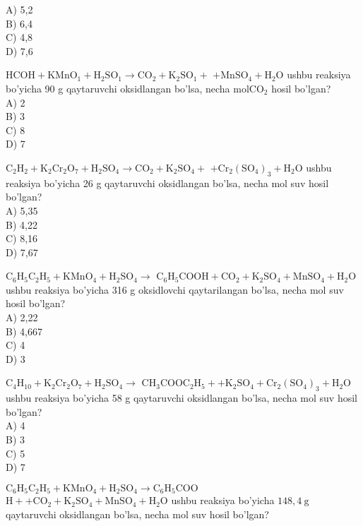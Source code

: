 A) 5,2\\
B) 6,4\\
C) 4,8\\
D) 7,6
  \item $\mathrm{HCOH}+\mathrm{KMnO}_{1}+\mathrm{H}_{2} \mathrm{SO}_{1} \rightarrow \mathrm{CO}_{2}+\mathrm{K}_{2} \mathrm{SO}_{1}+$ $+\mathrm{MnSO}_{4}+\mathrm{H}_{2} \mathrm{O}$ ushbu reaksiya bo'yicha 90 g qaytaruvchi oksidlangan bo'lsa, necha $\mathrm{mol} \mathrm{CO}_{2}$ hosil bo'lgan?\\
A) 2\\
B) 3\\
C) 8\\
D) 7
  \item $\mathrm{C}_{2} \mathrm{H}_{2}+\mathrm{K}_{2} \mathrm{Cr}_{2} \mathrm{O}_{7}+\mathrm{H}_{2} \mathrm{SO}_{4} \rightarrow \mathrm{CO}_{2}+\mathrm{K}_{2} \mathrm{SO}_{4}+$ $+\mathrm{Cr}_{2}\left(\mathrm{SO}_{4}\right)_{3}+\mathrm{H}_{2} \mathrm{O}$ ushbu reaksiya bo'yicha 26 g qaytaruvchi oksidlangan bo'lsa, necha mol suv hosil bo'lgan?\\
A) 5,35\\
B) 4,22\\
C) 8,16\\
D) 7,67
  \item $\mathrm{C}_{6} \mathrm{H}_{5} \mathrm{C}_{2} \mathrm{H}_{5}+\mathrm{KMnO}_{4}+\mathrm{H}_{2} \mathrm{SO}_{4} \rightarrow$ $\mathrm{C}_{6} \mathrm{H}_{5} \mathrm{COOH}+\mathrm{CO}_{2}+\mathrm{K}_{2} \mathrm{SO}_{4}+\mathrm{MnSO}_{4}+\mathrm{H}_{2} \mathrm{O}$ ushbu reaksiya bo'yicha 316 g oksidlovchi qaytarilangan bo'lsa, necha mol suv hosil bo'lgan?\\
A) 2,22\\
B) 4,667\\
C) 4\\
D) 3
  \item $\mathrm{C}_{4} \mathrm{H}_{10}+\mathrm{K}_{2} \mathrm{Cr}_{2} \mathrm{O}_{7}+\mathrm{H}_{2} \mathrm{SO}_{4} \rightarrow$ $\mathrm{CH}_{3} \mathrm{COOC}_{2} \mathrm{H}_{5}++\mathrm{K}_{2} \mathrm{SO}_{4}+\mathrm{Cr}_{2}\left(\mathrm{SO}_{4}\right)_{3}+\mathrm{H}_{2} \mathrm{O}$ ushbu reaksiya bo'yicha 58 g qaytaruvchi oksidlangan bo'lsa, necha mol suv hosil bo'lgan?\\
A) 4\\
B) 3\\
C) 5\\
D) 7
  \item $\mathrm{C}_{6} \mathrm{H}_{5} \mathrm{C}_{2} \mathrm{H}_{5}+\mathrm{KMnO}_{4}+\mathrm{H}_{2} \mathrm{SO}_{4} \rightarrow \mathrm{C}_{6} \mathrm{H}_{5} \mathrm{COO}$ $\mathrm{H}++\mathrm{CO}_{2}+\mathrm{K}_{2} \mathrm{SO}_{4}+\mathrm{MnSO}_{4}+\mathrm{H}_{2} \mathrm{O}$ ushbu reaksiya bo'yicha $148,4 \mathrm{~g}$ qaytaruvchi oksidlangan bo'lsa, necha mol suv hosil bo'lgan?\\
